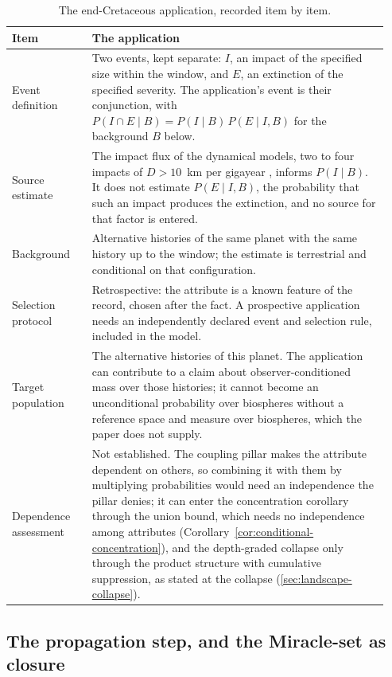\documentclass[11pt]{article}
\theoremstyle{definition}
\begin{document}
\begin{table}[ht]
\centering
\small
\caption{The end-Cretaceous application, recorded item by item.}
\label{tab:application}
\begin{tabular}{@{}p{0.2\linewidth}p{0.74\linewidth}@{}}
\toprule
Item & The application \\
\midrule
Event definition & Two events, kept separate: $I$, an impact of the specified size within the window, and $E$, an extinction of the specified severity. The application's event is their conjunction, with $P(I \cap E \mid B) = P(I \mid B)\, P(E \mid I, B)$ for the background $B$ below. \\
Source estimate & The impact flux of the dynamical models, two to four impacts of $D > 10$~km per gigayear \cite{nesvorny2021dark}, informs $P(I \mid B)$. It does not estimate $P(E \mid I, B)$, the probability that such an impact produces the extinction, and no source for that factor is entered. \\
Background & Alternative histories of the same planet with the same history up to the window; the estimate is terrestrial and conditional on that configuration. \\
Selection protocol & Retrospective: the attribute is a known feature of the record, chosen after the fact. A prospective application needs an independently declared event and selection rule, included in the model. \\
Target population & The alternative histories of this planet. The application can contribute to a claim about observer-conditioned mass over those histories; it cannot become an unconditional probability over biospheres without a reference space and measure over biospheres, which the paper does not supply. \\
Dependence assessment & Not established. The coupling pillar makes the attribute dependent on others, so combining it with them by multiplying probabilities would need an independence the pillar denies; it can enter the concentration corollary through the union bound, which needs no independence among attributes (Corollary~\ref{cor:conditional-concentration}), and the depth-graded collapse only through the product structure with cumulative suppression, as stated at the collapse (\autoref{sec:landscape-collapse}). \\
\bottomrule
\end{tabular}
\end{table}

\subsection{The propagation step, and the Miracle-set as closure}\label{sec:coupling-closure}
\end{document}
